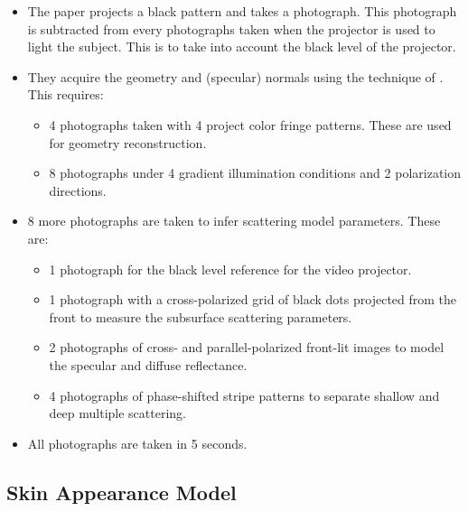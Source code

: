 \documentclass[10pt]{article}
\begin{document}
\begin{itemize}
		\item The paper projects a black pattern and takes a photograph.  This photograph is subtracted from every photographs taken when the projector is used to light the subject.  This is to take into account the black level of the projector.

		\item They acquire the geometry and (specular) normals using the technique of \cite{Ma:2007}.  This requires:
		\begin{itemize}
			\item 4 photographs taken with 4 project color fringe patterns.  These are used for geometry reconstruction.
			\item 8 photographs under 4 gradient illumination conditions and 2 polarization directions. 
		\end{itemize}

		\item 8 more photographs are taken to infer scattering model parameters.  These are:
		\begin{itemize}
			\item 1 photograph for the black level reference for the video projector.
			\item 1 photograph with a cross-polarized grid of black dots projected from the front to measure the subsurface scattering parameters.
			\item 2 photographs of cross- and parallel-polarized front-lit images to model the specular and diffuse reflectance.
			\item 4 photographs of phase-shifted stripe patterns to separate shallow and deep multiple scattering.
		\end{itemize}

		\item All photographs are taken in 5 seconds.
  	\end{itemize}

  	\subsection{Skin Appearance Model}
\end{document}
